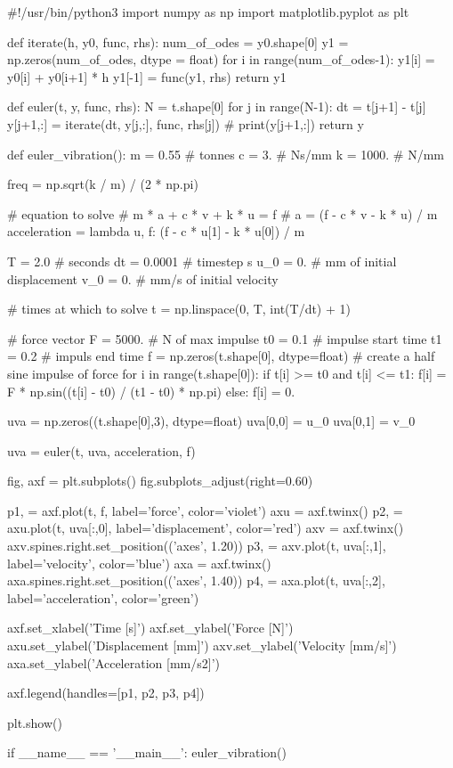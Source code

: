 \begin{python}
#!/usr/bin/python3
import numpy as np
import matplotlib.pyplot as plt


def iterate(h, y0, func, rhs):
    num_of_odes = y0.shape[0]
    y1 = np.zeros(num_of_odes, dtype = float)
    for i in range(num_of_odes-1):
        y1[i] = y0[i] + y0[i+1] * h
    y1[-1] = func(y1, rhs)
    return y1


def euler(t, y, func, rhs):
    N = t.shape[0]
    for j in range(N-1):
        dt = t[j+1] - t[j]
        y[j+1,:] = iterate(dt, y[j,:], func, rhs[j])
        # print(y[j+1,:])
    return y


def euler_vibration():
    m = 0.55  # tonnes
    c = 3.    # Ns/mm
    k = 1000. # N/mm

    freq = np.sqrt(k / m) / (2 * np.pi)

    # equation to solve
    # m * a + c * v + k * u = f
    # a = (f - c * v - k * u) / m
    acceleration = lambda u, f: (f - c * u[1] - k * u[0]) / m

    T = 2.0     # seconds
    dt = 0.0001 # timestep s
    u_0 = 0.    # mm of initial displacement
    v_0 = 0.    # mm/s of initial velocity

    # times at which to solve
    t = np.linspace(0, T, int(T/dt) + 1)

    # force vector
    F = 5000. # N of max impulse
    t0 = 0.1  # impulse start time
    t1 = 0.2  # impuls end time
    f = np.zeros(t.shape[0], dtype=float)
    # create a half sine impulse of force
    for i in range(t.shape[0]):
        if t[i] >= t0 and t[i] <= t1:
            f[i] = F * np.sin((t[i] - t0) / (t1 - t0) * np.pi)
        else:
            f[i] = 0.

    uva = np.zeros((t.shape[0],3), dtype=float)
    uva[0,0] = u_0
    uva[0,1] = v_0

    uva = euler(t, uva, acceleration, f)

    fig, axf = plt.subplots()
    fig.subplots_adjust(right=0.60)

    p1, = axf.plot(t, f, label='force', color='violet')
    axu = axf.twinx()
    p2, = axu.plot(t, uva[:,0], label='displacement', color='red')
    axv = axf.twinx()
    axv.spines.right.set_position(('axes', 1.20))
    p3, = axv.plot(t, uva[:,1], label='velocity', color='blue')
    axa = axf.twinx()
    axa.spines.right.set_position(('axes', 1.40))
    p4, = axa.plot(t, uva[:,2], label='acceleration', color='green')

    axf.set_xlabel('Time [s]')
    axf.set_ylabel('Force [N]')
    axu.set_ylabel('Displacement [mm]')
    axv.set_ylabel('Velocity [mm/s]')
    axa.set_ylabel('Acceleration [mm/s2]')

    axf.legend(handles=[p1, p2, p3, p4])

    plt.show()

if __name__ == '__main__':
    euler_vibration()

\end{python}

